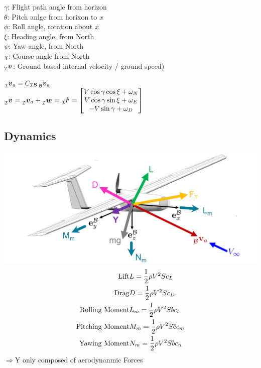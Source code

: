 \documentclass[a4paper, 8pt]{extarticle}
\newcommand{\mvec}[3]{  \prescript{}{\mathcal{#1}}{\bm{#2}}  _{#3} }
\begin{document}
\begin{multicols*}{3}
$\gamma$: Flight path angle from horizon\\
$\theta$: Pitch anlge from horixon to $x$\\
$\phi$: Roll angle, rotation about $x$\\
$\xi$: Heading angle, from North\\
$\psi$: Yaw angle, from North\\
$\chi$: Course angle from North\\
$\mvec{\mathcal{I}}{v}{}$: Ground based internal velocity / ground speed)

$\mvec{\mathcal{I}}{v}{a}=C_{\mathcal{IB}}\mvec{\mathcal{B}}{v}{a}$\\
$\mvec{\mathcal{I}}{v}{}=\mvec{\mathcal{I}}{v}{a}+\mvec{\mathcal{I}}{w}{}=\mvec{\mathcal{I}}{\dot{r}}{}=\begin{bmatrix}
V\cos{\gamma}\cos{\xi}+\omega_{N}\\
V\cos{\gamma}\sin{\xi}+\omega_{E}\\
-V\sin{\gamma}+\omega_{D}
\end{bmatrix}$


\subsection{Dynamics}
\includegraphics[width=1\linewidth]{images/FW_Dynamics.PNG}
\begin{align*}
\textrm{Lift} &L=\frac{1}{2}\rho V^2Sc_{L}\\
\textrm{Drag} &D=\frac{1}{2}\rho V^2 S c_{D}\\
\textrm{Rolling Moment} &L_{m}=\frac{1}{2}\rho V^2 S b c_{l}\\
\textrm{Pitching Moment} &M_{m}=\frac{1}{2}\rho V^2 S \overline{\rm c} c_{m}\\
\textrm{Yawing Moment} &N_{m}=\frac{1}{2}\rho V^2 S b c_{n}\\
\end{align*}
$\Rightarrow$Y only composed of aerodynanmic Forces
\newline


\end{multicols*}
\end{document}
